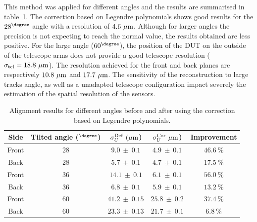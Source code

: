       This method was applied for different angles and the results are summarised in table~\ref{tab:correctionOfDeformation}. 
      The correction based on Legendre polynomials shows good results for the $28^{\degree}$ angle with a resolution of $4.6~\rm{\mu m}$.
      Although for larger angles the precision is not expecting to reach the normal value, the results obtained are less positive.
      For the large angle ($60^{\degree}$), the position of the \gls{DUT} on the outside of the telescope arms does not provide a good telescope resolution ($\sigma_{\rm{tel}} = 18.8~\rm{\mu m}$).
      The resolution achieved for the front and back planes are respectively $10.8~\rm{\mu m}$ and $17.7~\rm{\mu m}$.
      The sensitivity of the reconstruction to large tracks angle, as well as a unadapted telescope configuration impact severely the estimation of the spatial resolution of the sensors.

      \begin{table}[!h]
        \centering
        \begin{tabular}{c c c c c}
          \hline %
          Side &  Tilted angle ($^{\degree}$)  &   $\sigma_{U}^{\rm{Def}}~(\rm{\mu m}$) &   $\sigma_{U}^{\rm{Cor}}~\rm{\mu m}$) & Improvement \\
          \hline %
          \hline %
          Front &      28       & $ 9.0 \ \pm \ 0.1 $ & $ 4.9 \ \pm \ 0.1 $ &    $46.6 \ \%$  \tabularnewline
          Back  &      28       & $ 5.7 \ \pm \ 0.1 $ & $ 4.7 \ \pm \ 0.1 $ &    $17.5 \ \%$  \tabularnewline
          \hline %
          Front &      36       & $ 14.1 \ \pm \ 0.1 $ & $ 6.1 \ \pm \ 0.1 $ &    $56.0 \ \%$ \tabularnewline
          Back  &      36       & $ 6.8 \ \pm \ 0.1 $ & $ 5.9 \ \pm \ 0.1 $ &    $13.2 \ \%$  \tabularnewline
          \hline %
          Front &      60       & $ 41.2 \ \pm \ 0.15$ & $25.8 \ \pm \ 0.2$  &    $37.4 \ \%$ \tabularnewline
          Back  &      60       & $ 23.3 \ \pm \ 0.13$ & $21.7 \ \pm \ 0.1$  &    $6.8 \ \%$  \tabularnewline
          \hline %
        \end{tabular}
        \caption{Alignment results for different angles before and after using the correction based on Legendre polynomials.}
        \label{tab:correctionOfDeformation}
      \end{table}

